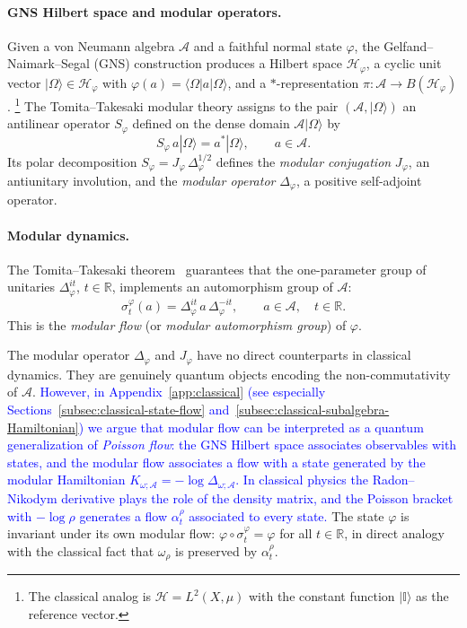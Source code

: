 \documentclass[a4paper,11pt]{article}
\theoremstyle{definition}
\theoremstyle{remark}
\newcommand{\id}{\mathbb{I}}
\newcommand{\mA}{\mathcal{A}}
\begin{document}
\paragraph{GNS Hilbert space and modular operators.}
Given a von Neumann algebra $\mathcal{A}$ and a faithful normal state $\varphi$, the
Gelfand--Naimark--Segal (GNS) construction produces a Hilbert space
$\mathcal{H}_\varphi$, a cyclic unit vector $|\Omega\rangle\in\mathcal{H}_\varphi$
with $\varphi(a)=\langle\Omega|a|\Omega\rangle$, and a $*$-representation
$\pi:\mathcal{A}\to B(\mathcal{H}_\varphi)$.%
\footnote{The classical analog is $\mathcal{H}=L^2(X,\mu)$ with the constant function
  $|\id\rangle$ as the reference vector.}
The Tomita--Takesaki modular theory assigns to the pair $(\mathcal{A},|\Omega\rangle)$
an antilinear operator $S_\varphi$ defined on the dense domain
$\mathcal{A}|\Omega\rangle$ by
\begin{equation}
  S_\varphi\, a|\Omega\rangle = a^*|\Omega\rangle, \qquad a\in\mathcal{A}.
  \label{eq:Tomita-S}
\end{equation}
Its polar decomposition $S_\varphi = J_\varphi\,\Delta_\varphi^{1/2}$ defines the
\emph{modular conjugation} $J_\varphi$, an antiunitary involution, and the
\emph{modular operator} $\Delta_\varphi$, a positive self-adjoint operator.
 
\paragraph{Modular dynamics.}
The Tomita--Takesaki theorem~\cite{Takesaki1970} guarantees that the one-parameter
group of unitaries $\Delta_\varphi^{it}$, $t\in\mathbb{R}$, implements an
automorphism group of $\mathcal{A}$:
\begin{equation}
  \sigma_t^\varphi(a) = \Delta_\varphi^{it}\, a\, \Delta_\varphi^{-it},
  \qquad a\in\mathcal{A},\quad t\in\mathbb{R}.
  \label{eq:modular-flow}
\end{equation}
This is the \emph{modular flow} (or \emph{modular automorphism group}) of $\varphi$.
 
The modular operator $\Delta_\varphi$ and $J_\varphi$ have no direct counterparts in
classical dynamics.  They are genuinely quantum objects encoding the non-commutativity
of $\mathcal{A}$.  \textcolor{blue}{However, in Appendix~\ref{app:classical} (see especially
Sections~\ref{subsec:classical-state-flow} and~\ref{subsec:classical-subalgebra-Hamiltonian})
we argue that modular flow can be interpreted as a quantum generalization of
\emph{Poisson flow}: the GNS Hilbert space associates observables with states, and the
modular flow associates a flow with a state generated by the modular Hamiltonian
$K_{\omega;\mA}=-\log\Delta_{\omega;\mA}$.  In classical physics the Radon--Nikodym
derivative plays the role of the density matrix, and the Poisson bracket with
$-\log\rho$ generates a flow $\alpha_t^\rho$ associated to every state.}
The state $\varphi$ is invariant under its own modular flow:
$\varphi\circ\sigma_t^\varphi = \varphi$ for all $t\in\mathbb{R}$, in direct analogy
with the classical fact that $\omega_\rho$ is preserved by $\alpha_t^\rho$.
 
\end{document}
